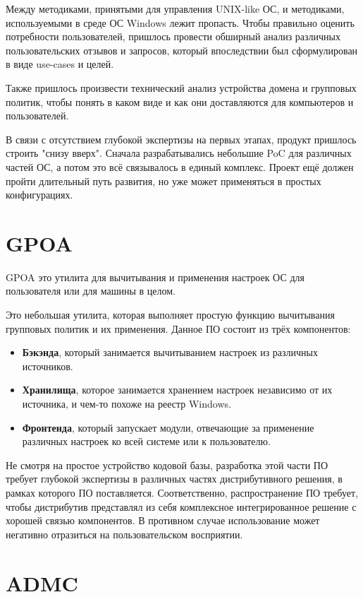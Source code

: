 Между методиками, принятыми для управления UNIX-like ОС, и методиками,
используемыми в среде ОС Windows лежит пропасть. Чтобы правильно оценить
потребности пользователей, пришлось провести обширный анализ различных
пользовательских отзывов и запросов, который впоследствии был
сформулирован в виде use-cases и целей.

Также пришлось произвести технический анализ устройства домена и
групповых политик, чтобы понять в каком виде и как они доставляются
для компьютеров и пользователей.

В связи с отсутствием глубокой экспертизы на первых этапах, продукт
пришлось строить "снизу вверх". Сначала разрабатывались небольшие
PoC для различных частей ОС, а потом это всё связывалось в единый
комплекс. Проект ещё должен пройти длительный путь развития, но уже
может применяться в простых конфигурациях.

\section{GPOA}

GPOA это утилита для вычитывания и применения настроек ОС для
пользователя или для машины в целом.

Это небольшая утилита, которая выполняет простую функцию вычитывания
групповых политик и их применения. Данное ПО состоит из трёх
компонентов:

\begin{itemize}
\item \textbf{Бэкэнда}, который занимается вычитыванием настроек из
различных источников.
\item \textbf{Хранилища}, которое занимается хранением настроек
независимо от их источника, и чем-то похоже на реестр Windows.
\item \textbf{Фронтенда}, который запускает модули, отвечающие за
применение различных настроек ко всей системе или к пользователю.
\end{itemize}

Не смотря на простое устройство кодовой базы, разработка этой части ПО
требует глубокой экспертизы в различных частях дистрибутивного решения,
в рамках которого ПО поставляется. Соответственно, распространение ПО
требует, чтобы дистрибутив представлял из себя комплексное
интегрированное решение с хорошей связью компонентов. В противном случае
использование может негативно отразиться на пользовательском восприятии.

\section{ADMC}

